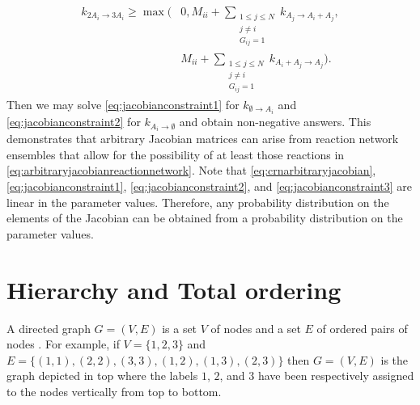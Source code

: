 \begin{equation}
\begin{aligned}
k_{2A_i \to 3A_i} \ge \max \bigg(&0, M_{ii} + \sum_{\substack{1 \le j \le N \\ j \neq i \\ G_{ij} = 1}} k_{A_j \to A_i + A_j}, \\
&M_{ii} + \sum_{\substack{1 \le j \le N \\ j \neq i \\ G_{ij} = 1}} k_{A_i + A_j \to A_j} \bigg).
\end{aligned}
\end{equation}
Then we may solve \ref{eq:jacobianconstraint1} for $k_{\emptyset \to A_i}$ and \ref{eq:jacobianconstraint2} for $k_{A_i \to \emptyset}$ and obtain non-negative answers. This demonstrates that arbitrary Jacobian matrices can arise from reaction network ensembles that allow for the possibility of at least those reactions in \ref{eq:arbitraryjacobianreactionnetwork}. Note that \ref{eq:crnarbitraryjacobian}, \ref{eq:jacobianconstraint1}, \ref{eq:jacobianconstraint2}, and \ref{eq:jacobianconstraint3} are linear in the parameter values. Therefore, any probability distribution on the elements of the Jacobian can be obtained from a probability distribution on the parameter values.

\section{Hierarchy and Total ordering}\label{sec:totalordering}

A directed graph $G=(V,E)$ is a set $V$ of nodes and a set $E$ of ordered pairs of nodes \cite{Cormen2009}. For example, if $V = \{1,2,3\}$ and $E = \{(1,1),(2,2),(3,3),(1,2),(1,3),(2,3)\}$ then $G=(V,E)$ is the graph depicted in  top where the labels $1$, $2$, and $3$ have been respectively assigned to the nodes vertically from top to bottom.

